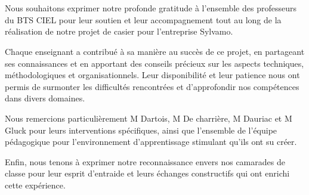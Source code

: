 \documentclass[main.tex]{subfiles}
\begin{document}
\section*{}
\quad Nous souhaitons exprimer notre profonde gratitude à l’ensemble des professeurs du BTS CIEL pour leur soutien et leur accompagnement tout au long de la réalisation de notre projet de casier pour l’entreprise Sylvamo.

Chaque enseignant a contribué à sa manière au succès de ce projet, en partageant ses connaissances et en apportant des conseils précieux sur les aspects techniques, méthodologiques et organisationnels. Leur disponibilité et leur patience nous ont permis de surmonter les difficultés rencontrées et d’approfondir nos compétences dans divers domaines.

Nous remercions particulièrement M Dartois, M De charrière, M Dauriac et M Gluck pour leurs interventions spécifiques, ainsi que l’ensemble de l’équipe pédagogique pour l’environnement d’apprentissage stimulant qu’ils ont su créer.

Enfin, nous tenons à exprimer notre reconnaissance envers nos camarades de classe pour leur esprit d’entraide et leurs échanges constructifs qui ont enrichi cette expérience.



\newpage
\end{document}
